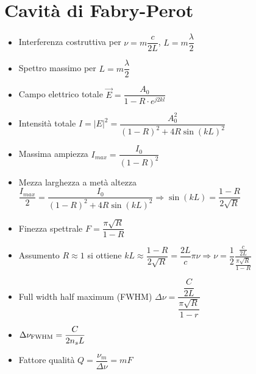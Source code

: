 \documentclass{article}
\begin{document}
\section {Cavità di Fabry-Perot}
\begin{itemize}
  \item Interferenza costruttiva per \(  \nu = m \dfrac{c}{2L} \), \( L = m \dfrac{\lambda}{2} \)
  \item Spettro massimo per \( L = m \dfrac{\lambda}{2} \)
  \item Campo elettrico totale \( \vec{E} = \dfrac{A_0}{1-R \cdot e^ {j 2 k l}} \)
  \item Intensità totale \( I = | E | ^ 2 = \dfrac{A_0^2}{(1-R)^2+ 4 R \sin(kL)^2} \)
  \item Massima ampiezza \( I_{max} = \dfrac{I_0}{(1-R)^2} \)
  \item Mezza larghezza a metà altezza \(  \dfrac{I_{max}}{2} = \dfrac{I_0}{(1- R)^2 + 4 R \sin(k L) ^ 2} \Rightarrow \sin(k L) = \dfrac{1 - R}{2 \sqrt{R}}\)
  \item Finezza spettrale \( F = \dfrac{\pi \sqrt{R}}{1-R} \)
  \item Assumento \( R \approx 1 \) si ottiene \( kL \approx \dfrac{1 - R}{2 \sqrt{R}} = \dfrac{2L}{c} \pi \nu \Rightarrow \nu = \dfrac{1}{2} \dfrac{ \frac{c}{2L}}{\frac{\pi \sqrt{R}}{1-R}}\)
  \item Full width half maximum (FWHM) \( \Delta \nu  = \dfrac{\dfrac{C}{2L}}{\dfrac{\pi \sqrt{R}}{1 - r}} \)
  \item \( \Delta \nu _ {\textnormal{FWHM}} = \dfrac{C}{2 n_s L} \)
  \item Fattore qualità \( Q = \dfrac{\nu_m}{\Delta \nu} = m F \)
\end{itemize}
\end{document}

